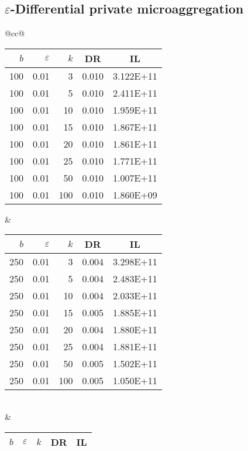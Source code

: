 \subsection{$\varepsilon$-Differential private microaggregation}
\label{Benchmarking:Results:DiffPriv}

\begin{table}[H]
	\centering
	\begin{tabular}{@{}cc@{}}
		\begin{tabular}{@{}rrrrr@{}}
			\toprule
			$b$ & $\varepsilon$ & $k$ & \multicolumn{1}{c}{DR} & \multicolumn{1}{c}{IL} \\ \midrule
			100 & 0.01 & 3   & 0.010 & 3.122E+11 \\
			100 & 0.01 & 5   & 0.010 & 2.411E+11 \\
			100 & 0.01 & 10  & 0.010 & 1.959E+11 \\
			100 & 0.01 & 15  & 0.010 & 1.867E+11 \\
			100 & 0.01 & 20  & 0.010 & 1.861E+11 \\
			100 & 0.01 & 25  & 0.010 & 1.771E+11 \\
			100 & 0.01 & 50  & 0.010 & 1.007E+11 \\
			100 & 0.01 & 100 & 0.010 & 1.860E+09 \\ \bottomrule
		\end{tabular}
		&
		\begin{tabular}{@{}rrrrr@{}}
			\toprule
			$b$ & $\varepsilon$ & $k$ & \multicolumn{1}{c}{DR} & \multicolumn{1}{c}{IL} \\ \midrule
			250 & 0.01 & 3   & 0.004 & 3.298E+11 \\
			250 & 0.01 & 5   & 0.004 & 2.483E+11 \\
			250 & 0.01 & 10  & 0.004 & 2.033E+11 \\
			250 & 0.01 & 15  & 0.005 & 1.885E+11 \\
			250 & 0.01 & 20  & 0.004 & 1.880E+11 \\
			250 & 0.01 & 25  & 0.004 & 1.881E+11 \\
			250 & 0.01 & 50  & 0.005 & 1.502E+11 \\
			250 & 0.01 & 100 & 0.005 & 1.050E+11 \\ \bottomrule
		\end{tabular}
		\\ & \\
		\begin{tabular}{@{}rrrrr@{}}
			\toprule
			$b$ & $\varepsilon$ & $k$ & \multicolumn{1}{c}{DR} & \multicolumn{1}{c}{IL} \\ \midrule

\end{tabular}
\end{tabular}
\end{table}
